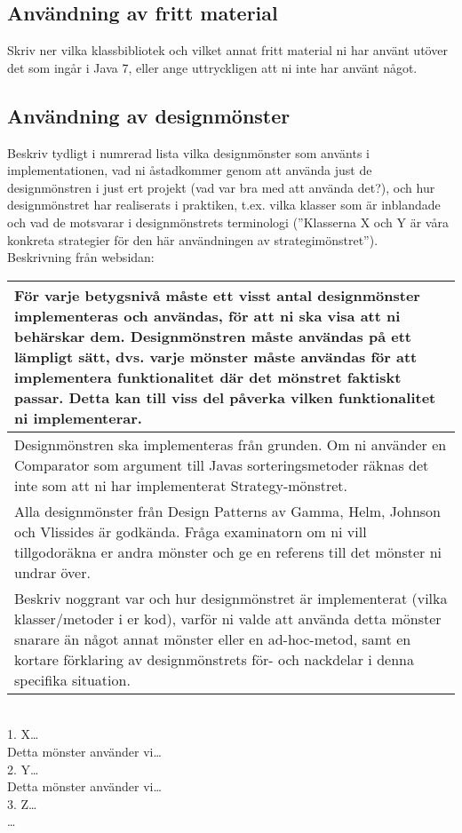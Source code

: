 \subsection{Användning av fritt material}
Skriv ner vilka klassbibliotek och vilket annat fritt material ni har använt utöver det som ingår i Java 7, eller ange uttryckligen att ni inte har använt något.\\
\subsection{Användning av designmönster}
Beskriv tydligt i numrerad lista vilka designmönster som använts i implementationen, vad ni åstadkommer genom att använda just de designmönstren i just ert projekt (vad var bra med att använda det?), och hur designmönstret har realiserats i praktiken, t.ex. vilka klasser som är inblandade och vad de motsvarar i designmönstrets terminologi (”Klasserna X och Y är våra konkreta strategier för den här användningen av strategimönstret”).\\
Beskrivning från websidan:\\
\begin{tabular}{| p{11cm} |}
    \hline
    För varje betygsnivå måste ett visst antal designmönster implementeras och användas, för att ni ska visa att ni behärskar dem. Designmönstren måste användas på ett lämpligt sätt, dvs. varje mönster måste användas för att implementera funktionalitet där det mönstret faktiskt passar. Detta kan till viss del påverka vilken funktionalitet ni implementerar. \\ \hline
    Designmönstren ska implementeras från grunden. Om ni använder en Comparator som argument till Javas sorteringsmetoder räknas det inte som att ni har implementerat Strategy-mönstret. \\ \hline
    Alla designmönster från Design Patterns av Gamma, Helm, Johnson och Vlissides är godkända. Fråga examinatorn om ni vill tillgodoräkna er andra mönster och ge en referens till det mönster ni undrar över. \\ \hline
    Beskriv noggrant var och hur designmönstret är implementerat (vilka klasser/metoder i er kod), varför ni valde att använda detta mönster snarare än något annat mönster eller en ad-hoc-metod, samt en kortare förklaring av designmönstrets för- och nackdelar i denna specifika situation. \\ \hline
\end{tabular}\\\vspace{11pt}
1. X\ldots\\
Detta mönster använder vi\ldots\\
2. Y\ldots\\
Detta mönster använder vi\ldots\\
3. Z\ldots\\
\ldots\\
